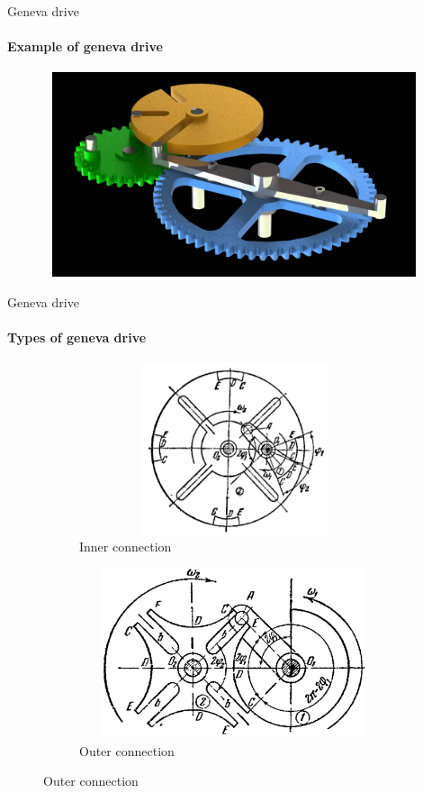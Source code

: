 \documentclass[aspectratio=169]{beamer}
\begin{document}
\begin{frame}[t]{Geneva drive}
    \framesubtitle{Example of geneva drive}
    \vspace{-0.6cm}
    \begin{figure}[H]
        \href{https://youtu.be/56l4rKLsha0}{
            \centering\includegraphics[height=6cm,width=1\textwidth,keepaspectratio]{geneva_drive_video.jpg}}
        \label{fig:geneva_drive_video.jpg}
    \end{figure}
\end{frame}

\begin{frame}[t]{Geneva drive}
\framesubtitle{Types of geneva drive}
\vspace{-0.6cm}
    \begin{figure}[H]
        \begin{subfigure}{0.49\textwidth}
            \centering\includegraphics[height=5cm,width=1\textwidth,keepaspectratio]{geneva_inner.png}
            \caption*{Inner connection}
            \label{fig:geneva_inner.png}
        \end{subfigure}
        \begin{subfigure}{0.49\textwidth}
            \centering\includegraphics[height=5cm,width=1\textwidth,keepaspectratio]{geneva_outer.png}
            \caption*{Outer connection}
            \label{fig:geneva_outer.png}
        \end{subfigure}
    \end{figure}
\end{frame}
\end{document}
